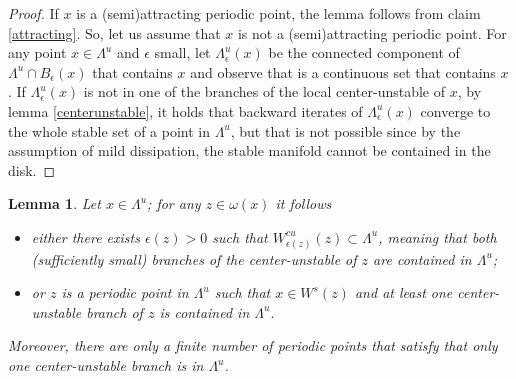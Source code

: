 \documentclass[a4paper,11pt]{article}
\newtheorem{lemma}{Lemma}
\theoremstyle{definition}
\def\La{\Lambda}
\def\e{\epsilon}
\def\La{\Lambda}
\begin{document}
\begin{proof}
If $x$ is a (semi)attracting periodic point, the lemma follows from claim \ref{attracting}. So, let us assume that  $x$ is not a (semi)attracting periodic point.
For any point $x\in \La^u$ and $\e$ small, let $\La^{u}_\e(x)$ be the connected component of $\La^u\cap B_\e(x)$ that contains $x$ and observe that  is a continuous set that contains $x$. If $\La^u_\e(x)$ is not in one of the branches of the  local center-unstable of $x$, by lemma \ref{centerunstable}, it holds that  backward iterates of $\La^u_\e(x)$ converge to the whole stable set of a point in $\La^u$, but that is not possible since by the assumption of mild dissipation, the stable manifold cannot be contained in the disk. 
\end{proof}



\begin{lemma}\label{cu-omega} Let $x\in \La^u$; for any $z\in \omega(x)$ it follows

\begin{itemize}
    \item[--] either  there exists $\e(z)>0$ such that $W^{cu}_{\e(z)}(z)\subset \La^u$, meaning that both (sufficiently small) branches of the center-unstable of $z$ are contained in $\La^u$;

    \item[--] or $z$ is a periodic point in $\La^u$ such that $x\in W^s(z)$ and at least one center-unstable branch of $z$ is contained in $\La^u.$
    



        

    
    
    
    
\end{itemize}


    Moreover, there are only a finite number of periodic points that satisfy that only one center-unstable branch is in $\La^u$.
\end{lemma}
\end{document}

